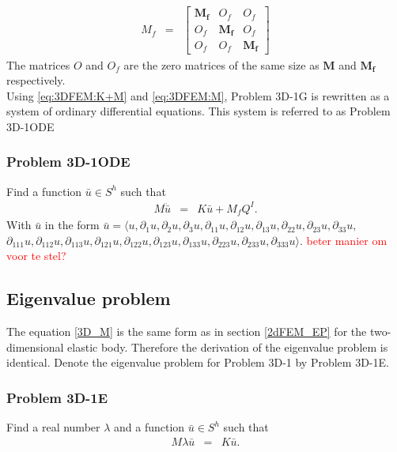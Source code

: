 \documentclass[../../main.tex]{subfiles}
\begin{document}
\begin{eqnarray}
	M_f & = &
	\begin{bmatrix}
		\mathbf{M_f} & {O_f} & {O_f}\\
		{O_f} & \mathbf{M_f} & {O_f}\\
		{O_f} & {O_f} & \mathbf{M_f}
	\end{bmatrix}\label{eq:3DFEM:M}
\end{eqnarray}
The matrices ${O}$ and ${O_f}$ are the zero matrices of the same size as $\mathbf{M}$ and $\mathbf{M_f}$ respectively.\\

Using \eqref{eq:3DFEM:K+M} and \eqref{eq:3DFEM:M}, Problem 3D-1G is rewritten as a system of ordinary differential equations. This system is referred to as Problem 3D-1ODE

\subsubsection{Problem 3D-1ODE}
Find a function $\bar{u} \in S^h$ such that
\begin{eqnarray}
	M\ddot{\bar{u}} & = & K\bar{u} + M_{f}Q^I. \label{3D_M}
\end{eqnarray} With $\bar{u}$ in the form $\bar{u} = \langle u, \partial_1 u, \partial_2 u, \partial_3 u, \partial_{11} u, \partial_{12}u, \partial_{13}u,\partial_{22}u,\partial_{23}u, \partial_{33}u,$\\$ \partial_{111}u, \partial_{112}u, \partial_{113}u, \partial_{121}u, \partial_{122}u, \partial_{123}u, \partial_{133}u,\partial_{223}u,\partial_{233}u,\partial_{333}u \rangle$. \textcolor{red}{beter manier om voor te stel?}

\subsection{Eigenvalue problem}
The equation \eqref{3D_M} is the same form as in section \ref{2dFEM_EP} for the two-dimensional elastic body. Therefore the derivation of the eigenvalue problem is identical. Denote the eigenvalue problem for Problem 3D-1 by Problem 3D-1E.

\subsubsection{Problem 3D-1E}
Find a real number $\lambda$ and a function $\bar{u} \in S^h$ such that
\begin{eqnarray}
	M\lambda{\bar{u}} & = & K\bar{u}.
\end{eqnarray}
\end{document}
